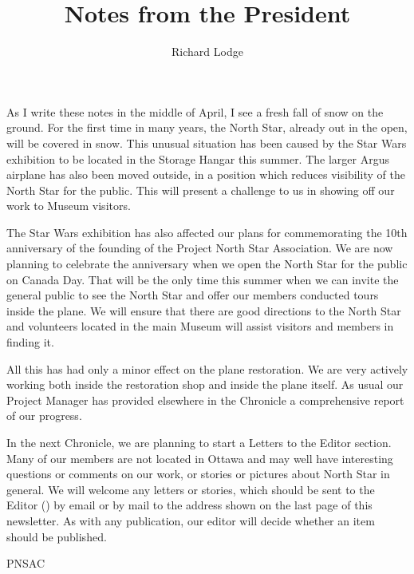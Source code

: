 %


\title{Notes from the President}
\author{Richard Lodge}

\maketitle

As I write these notes in the middle of April, I see a fresh fall of
snow on the ground.  For the first time in many years, the North Star,
already out in the open, will be covered in snow.  This unusual
situation has been caused by the Star Wars exhibition to be located in
the Storage Hangar this summer.  The larger Argus airplane has also
been moved outside, in a position which reduces visibility of the
North Star for the public.  This will present a challenge to us in
showing off our work to Museum visitors.

The Star Wars exhibition has also affected our plans for commemorating
the 10th anniversary of the founding of the Project North Star
Association.  We are now planning to celebrate the anniversary when we
open the North Star for the public on Canada Day.  That will be the
only time this summer when we can invite the general public to see the
North Star and offer our members conducted tours inside the plane.  We
will ensure that there are good directions to the North Star and
volunteers located in the main Museum will assist visitors and members
in finding it.

All this has had only a minor effect on the plane restoration.  We are
very actively working both inside the restoration shop and inside the
plane itself.  As usual our Project Manager has provided elsewhere in
the Chronicle a comprehensive report of our progress.

In the next Chronicle, we are planning to start a Letters to the
Editor section.  Many of our members are not located in Ottawa and may
well have interesting questions or comments on our work, or stories or
pictures about North Star in general.  We will welcome any letters or
stories, which should be sent to the Editor
() by email or by mail to the
address shown on the last page of this newsletter.  As with any
publication, our editor will decide whether an item should be
published.


\begin{footnotesize}
    \raggedleft PNSAC\\
\end{footnotesize}



